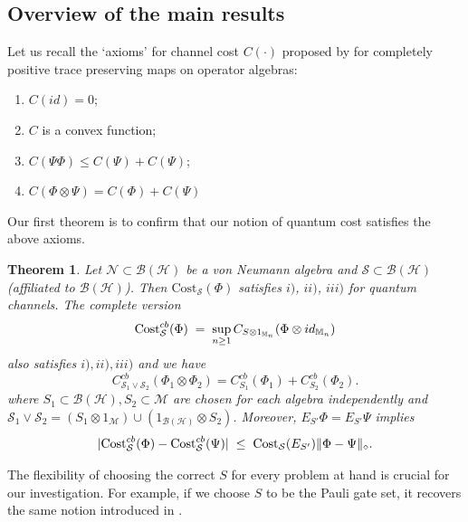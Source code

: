 \documentclass[11pt,reqno]{amsart}
\numberwithin{equation}{section}
\newtheorem{theorem}[lemma]{Theorem}
\newcommand{\mb}{\mathbb}
\newcommand{\mc}{\mathcal}
\newcommand{\Cost}{\mathrm{Cost}}
\newcommand{\pl}{\hspace{.1cm}}
\newcommand{\kl}{\pl \le \pl}
\newcommand{\lel}{\pl = \pl}
\begin{document}




\iffalse
\subsection{Overview of the main results}
\color{red}Let us recall the `axioms' for channel cost $C(\cdot)$ proposed by \cite{LBKJL} for completely positive trace preserving maps on operator algebras: \color{black}
\begin{enumerate}
\item[i)] $C(id)=0$; 
\item[ii)] $C$ is a convex function;
\item[iii)] $C(\Psi\Phi)\le C(\Psi)+C(\Psi)$;
\item[iv)] $C(\Phi\otimes  \Psi)=C(\Phi)+C(\Psi)$
\end{enumerate} 
Our first theorem is to confirm that our notion of quantum cost satisfies the above axioms.

\begin{theorem}\label{basic} 
Let $\mc N\subset \mc B(\mc H)$ be a von Neumann algebra and $\mc S \subset \mc B(\mc H)$ (affiliated to $\mc B(\mc H)$). Then $\Cost_{\mc S}(\Phi)$ satisfies $i)$, $ii)$, $iii)$ for quantum channels. The complete version 
 \[ \Cost_{\mc S}^{cb}(\Phi) \lel \sup_{n \ge 1} C_{S\otimes  1_{\mb M_n}}(\Phi \otimes  id_{\mb M_n}) \]
also satisfies $i),ii),iii)$ and we have 
\begin{equation}
C_{\mc S_1 \vee \mc S_2}^{cb}(\Phi_1 \otimes \Phi_2) = C_{S_1}^{cb}(\Phi_1) + C_{S_2}^{cb}(\Phi_2).
\end{equation}
where $S_1 \subset \mc B(\mc H), S_2 \subset \mc M$ are chosen for each algebra independently and $\mc S_1 \vee \mc S_2 = (S_1\otimes 1_{\mc M}) \cup (1_{\mc B(\mc H)}\otimes S_2)$. Moreover, $E_{S'}\Phi = E_{S'} \Psi$ implies
\begin{equation}
    |\Cost_{\mc S}^{cb}(\Phi)-\Cost_{\mc S}^{cb}(\Psi)|\kl \Cost_{\mc S}(E_{S'}) \|\Phi-\Psi\|_{\diamond}.
\end{equation}
\end{theorem}   

The flexibility of choosing the correct $S$ for every problem at hand is crucial for our investigation. For example, if we choose $S$ to be the Pauli gate set, it recovers the same notion introduced in \cite{LBKJL}. 
\end{document}
